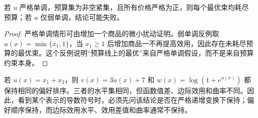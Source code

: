 \begin{proposition}[严格单调与财富耗尽的再核对]
若 $u$ 严格单调，预算集为非空紧集，且所有价格严格为正，则每个最优束均耗尽预算；若 $u$ 仅弱单调，结论可能失败。
\end{proposition}
\begin{proof}
严格单调情形可由增加一个商品的微小扰动证明。弱单调反例取 $u(x)=\min\{x_1,1\}$，当 $x_1\ge1$ 后增加商品一不再提高效用，因此存在未耗尽预算的最优束。这个反例说明“预算线上的最优”来自严格单调假设，而不是来自预算约束本身。
\end{proof}

\begin{example}[同一偏好下的不同数值表示]
若 $u(x)=x_1+x_2$，则 $v(x)=3u(x)+7$ 和 $w(x)=\log(1+e^{u(x)})$ 都保持相同的偏好排序。三者的水平集相同，但函数值差、边际效用和曲率不同。因此，看到某个表示的导数符号时，必须先问该结论是否在严格递增变换下保持；偏好顺序保持，而边际效用水平、效用差值和曲率通常不保持。
\end{example}
